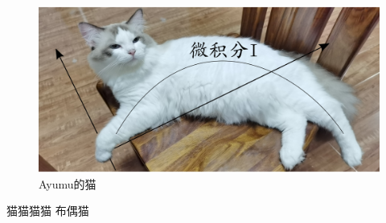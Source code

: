 \begin{figure}[b]
    \centering
    \includegraphics[scale=0.6]{figure/Ragdoll.png}
    \caption{Ayumu的猫}
\end{figure}

\begin{center}
    
\end{center}


\begin{center}
    \def\svgwidth{0.7\columnwidth}
    
\end{center}

\begin{theorem}
\begin{center}
    \def\svgwidth{0.7\columnwidth}
    
\end{center}
\end{theorem}

\begin{theorem}
\begin{minipage}{0.5\textwidth}
猫猫猫猫 布偶猫
\end{minipage}
\begin{minipage}{0.5\textwidth}
\begin{center}
    \def\svgwidth{0.7\columnwidth}
    
\end{center}
\end{minipage}
\end{theorem}